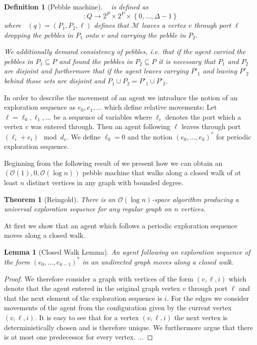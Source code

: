 \documentclass[draft,oneside]{scrartcl}
\newtheorem{thm}{Theorem}
\newtheorem{definition}{Definition}
\newtheorem{lem}{Lemma}
\DeclareMathOperator{\dout}{\delta_{\mathit{out}}}
\begin{document}
\begin{definition}[Pebble machine]
  $\dout$ is defined as
  \begin{equation*}
    \dout\colon Q
    \rightarrow 2^{P}\times 2^{P}\times \left\{0,\dots,\Delta - 1\right\}
  \end{equation*}
  where $\dout(q) = (P_{1}, P_{2}, \ell)$ defines that $\mathcal{M}$ leaves
  a vertex $v$ through port $\ell$ dropping the pebbles in $P_{1}$ onto $v$
  and carrying the pebble in $P_{2}$.

  We additionally demand consistency of pebbles, i.e. that if the agent
  carried the pebbles in $P_{1}\subseteq P$ and found the pebbles in
  $P_{2}\subseteq P$ it is necessary that $P_{1}$ and $P_{2}$ are disjoint and
  furthermore that if the agent leaves carrying $P'_{1}$ and leaving $P'_{2}$
  behind those sets are disjoint and $P_{1}\cup P_{2} = P'_{1}\cup P'_{2}$.
\end{definition}

In order to describe the movement of an agent we introduce the notion of an
exploration sequence as $e_{0}, e_{1},\dots$ which define relative movements:
Let $\ell = \ell_{0},\ell_{1},\dots$ be a sequence of variables where
$\ell_{i}$ denotes the port which a vertex $v$ was entered through. Then an
agent following $\ell$ leaves through port
$(\ell_{i} + e_{i}) \mod d_{v}$. We define $\ell_{0} = 0$ and the notion
$(e_{0},\dots,e_{k})^{\ast}$ for periodic exploration sequence.

Beginning from the following result of \cite{logspacealg} we present how we can
obtain an $(\mathcal{O}(1),0,\mathcal{O}(\log n))$ pebble machine that walks
along a closed walk of at least $n$ distinct vertices in any graph with bounded
degree.
\begin{thm}[Reingold]
  \label{thm:logalg}
  There is an $\mathcal{O}(\log n)$-space algorithm producing a universal
  exploration sequence for any regular graph on $n$ vertices.
\end{thm}
At first we show that an agent which follows a periodic exploration sequence
moves along a closed walk.
\begin{lem}[Closed Walk Lemma]
  An agent following an exploration sequence of the form
  $(e_{0},\dots,e_{k-1})^{\ast}$ in an undirected graph moves along a closed
  walk.
\end{lem}
\begin{proof}
  We therefore consider a graph with vertices of the form $(v,\ell,i)$ which
  denote that the agent entered in the original graph vertex $v$ through port
  $\ell$ and that the next element of the exploration sequence is $i$. For the
  edges we consider movements of the agent from the configuration given by the
  current vertex $(v,\ell,i)$. It is easy to see that for a vertex $(v,\ell,i)$
  the next vertex is deterministically chosen and is therefore unique. We
  furthermore argue that there is at most one predecessor for every vertex.
  ...
\end{proof}
\end{document}
